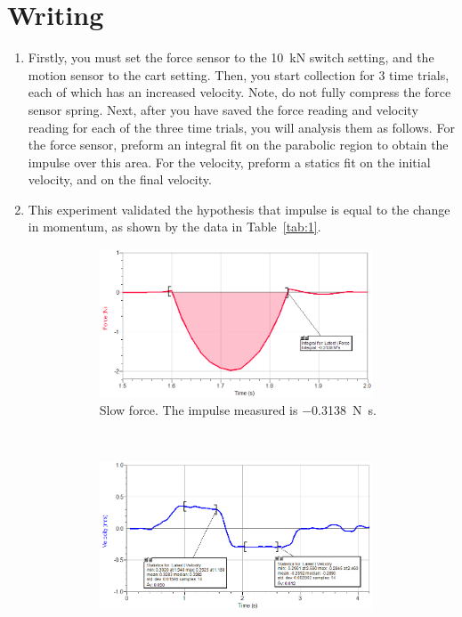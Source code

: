 \documentclass[12pt]{article}
\newcommand{\impls}[1]{\SI{#1}{\newton\second}}
\begin{document}
    \section{Writing}
    \begin{enumerate}
        [1)]
        \item Firstly, you must set the force sensor to the \SI{10}{\kilo\newton} switch setting, and the motion sensor to the cart setting.
        Then, you start collection for 3 time trials, each of which has an increased velocity.
        Note, do not fully compress the force sensor spring.
        Next, after you have saved the force reading and velocity reading for each of the three time trials, you will analysis them as follows.
        For the force sensor, preform an integral fit on the parabolic region to obtain the impulse over this area.
        For the velocity, preform a statics fit on the initial velocity, and on the final velocity.
        \item This experiment validated the hypothesis that impulse is equal to the change in momentum, as shown by the data in Table~\ref{tab:1}.
        \begin{figure}[H]
            \begin{subfigure}[t]{0.5\textwidth}
                \centering
                \includegraphics[width=3.2in]{slow_force}
                \caption{Slow force. The impulse measured is \impls{-0.3138}.}
            \end{subfigure}%
            ~
            \begin{subfigure}[t]{0.5\textwidth}
                \centering
                \includegraphics[width=3.2in]{slow_velo}

\end{subfigure}
\end{figure}
\end{enumerate}
\end{document}
